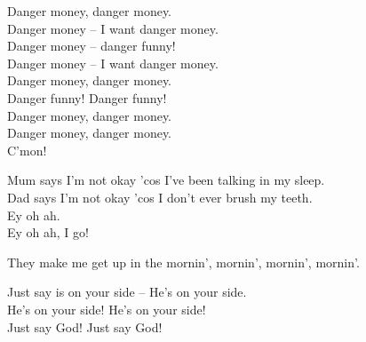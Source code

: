 
\label{ep:willoughbys-beach}




Danger money, danger money. \\
Danger money -- I want danger money. \\
Danger money -- danger funny! \\
Danger money -- I want danger money. \\

Danger money, danger money. \\
Danger funny! Danger funny! \\
Danger money, danger money. \\
Danger money, danger money. \\
C'mon! \\




Mum says I'm not okay 'cos I've been talking in my sleep. \\
Dad says I'm not okay 'cos I don't ever brush my teeth. \\

Ey oh ah. \\
Ey oh ah, I go! \\




They make me get up in the mornin', mornin', mornin', mornin'. \\




Just say  is on your side -- He's on your side. \\
He's on your side! He's on your side! \\
Just say God! Just say God! \\

